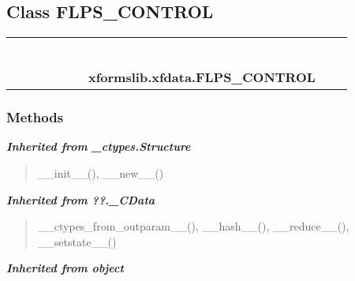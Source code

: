 \subsection{Class FLPS\_CONTROL}

    \label{xformslib:xfdata:FLPS_CONTROL}
\begin{tabular}{cccccccccc}
\multicolumn{2}{r}{\settowidth{\BCL}{object}\multirow{2}{\BCL}{object}}
&&
&&
&&
  \\\cline{3-3}
  &&\multicolumn{1}{c|}{}
&&
&&
&&
  \\
\multicolumn{4}{r}{\settowidth{\BCL}{??.\_CData}\multirow{2}{\BCL}{??.\_CData}}
&&
&&
  \\\cline{5-5}
  &&&&\multicolumn{1}{c|}{}
&&
&&
  \\
\multicolumn{6}{r}{\settowidth{\BCL}{\_ctypes.Structure}\multirow{2}{\BCL}{\_ctypes.Structure}}
&&
  \\\cline{7-7}
  &&&&&&\multicolumn{1}{c|}{}
&&
  \\
&&&&&&\multicolumn{2}{l}{\textbf{xformslib.xfdata.FLPS\_CONTROL}}
\end{tabular}



  \subsubsection{Methods}


\large{\textbf{\textit{Inherited from \_ctypes.Structure}}}

\begin{quote}
\_\_init\_\_(), \_\_new\_\_()
\end{quote}

\large{\textbf{\textit{Inherited from ??.\_CData}}}

\begin{quote}
\_\_ctypes\_from\_outparam\_\_(), \_\_hash\_\_(), \_\_reduce\_\_(), \_\_setstate\_\_()
\end{quote}

\large{\textbf{\textit{Inherited from object}}}

